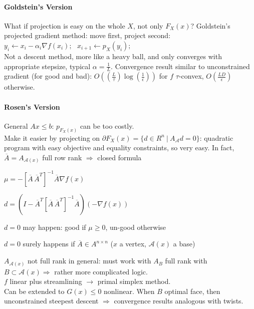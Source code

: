 \documentclass[10pt]{report}
\begin{document}
\paragraph{Goldstein's Version} What if projection is easy on the whole $X$, not only $F_X(x)$? Goldstein's projected gradient method: move first, project second: $y_i \leftarrow x_i - \alpha_i\nabla f(x_i);\:\:\:x_{i+1}\leftarrow p_X(y_i);$\\
Not a descent method, more like a heavy ball, and only converges with appropriate stepsize, typical $\alpha=\frac{1}{L}$. Convergence result similar to unconstrained gradient (for good and bad): $O\left(\left(\frac{L}{\tau}\right)\log\left(\frac{1}{\epsilon}\right)\right)$ for $f$ $\tau$-convex, $O\left(\frac{LD}{\epsilon}\right)$ otherwise.
\paragraph{Rosen's Version} General $Ax\leq b$: $p_{F_X(x)}$ can be too costly.\\
Make it easier by projecting on $\partial F_X(x)=\{d\in R^n\:|\:A_{\mathscr{A}}d=0\}$: quadratic program with easy objective and equality constraints, so very easy. In fact, $\overline{A}=A_{\mathscr{A}(x)}$ full row rank $\Rightarrow$ closed formula\begin{list}{}{}
	\item $\mu=-[\overline{A}\,\overline{A}^T]^{-1}\overline{A}\nabla f(x)$
	\item $d = (I-\overline{A}^T[\overline{A}\,\overline{A}^T]^{-1}\overline{A})(-\nabla f(x))$
	\begin{list}{}{}
		\item $d = 0$ may happen: good if $\mu \geq 0$, un-good otherwise
		\item $d = 0$ surely happens if $\overline{A}\in A^{n\times n}$ ($x$ a vertex, $\mathscr{A}(x)$ a base)
	\end{list}
\end{list}
$A_{\mathscr{A}(x)}$ not full rank in general: must work with $A_B$ full rank with $B\subset \mathscr{A}(x) \Rightarrow$ rather more complicated logic.\\
$f$ linear plus streamlining $\longrightarrow$ primal simplex method.\\
Can be extended to $G(x)\leq 0$ nonlinear. When $B$ optimal face, then unconstrained steepest descent $\Rightarrow$ convergence results analogous with twists.
\end{document}
